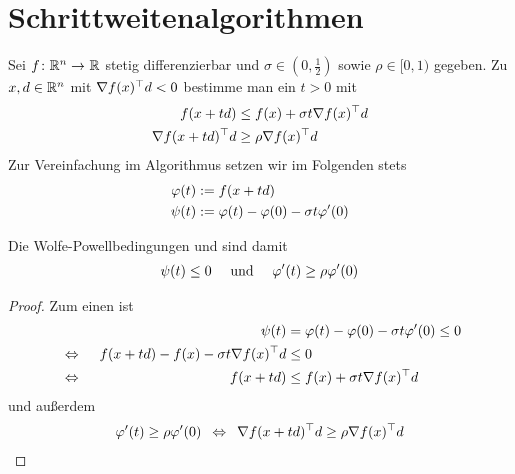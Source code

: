 \chapter{Schrittweitenalgorithmen}

\begin{erinnerung}
	Sei $\abb{f}{\R^n}{\R}$ stetig differenzierbar und $\sigma \in (0,\frac{1}{2})$ sowie $\rho \in [0,1)$ gegeben. Zu $x,d \in \mathbb{R}^n$ mit $\nabla f(x)^{\top} d < 0$ bestimme man ein $t > 0$ mit 
	\begin{align}
		f(x+td) &\le f(x) + \sigma t \nabla f(x)^{\top} d \label{eq: armijo2} \\
		\nabla f(x+td)^{\top} d &\ge \rho \nabla f(x)^{\top} d \label{eq: wp}
	\end{align}
	Zur Vereinfachung im Algorithmus setzen wir im Folgenden stets
	\begin{align*}
			\varphi(t) &\mathrel{:=} f(x+td) \\
			\psi(t) &\mathrel{:=} \varphi(t) - \varphi(0) - \sigma t \varphi'(0)
	\end{align*}
\end{erinnerung}

\begin{bemerkung}
	Die Wolfe-Powellbedingungen  und  sind damit 
	\begin{align*}
		\psi(t) \le 0 \quad \text{ und } \quad \varphi'(t) \ge \rho \varphi'(0) 
	\end{align*}
\end{bemerkung}
\begin{proof}
	Zum einen ist
	\begin{alignat*}{2}
		&&\psi(t) &= \varphi(t) - \varphi(0) - \sigma t \varphi'(0) \le 0 \\
		\enskip \Leftrightarrow \enskip &&f(x + td) - f(x) - \sigma t \nabla f(x)^{\top} d &\le 0 \\
		\enskip \Leftrightarrow \enskip &&f(x + td) &\le f(x) + \sigma t \nabla f(x)^{\top} d
	\end{alignat*}
	und außerdem
	\begin{align*}
		\varphi'(t) \ge \rho \varphi'(0) \enskip \Leftrightarrow \enskip \nabla f(x+td)^{\top} d \ge \rho \nabla f(x)^{\top} d
	\end{align*}
\end{proof}

